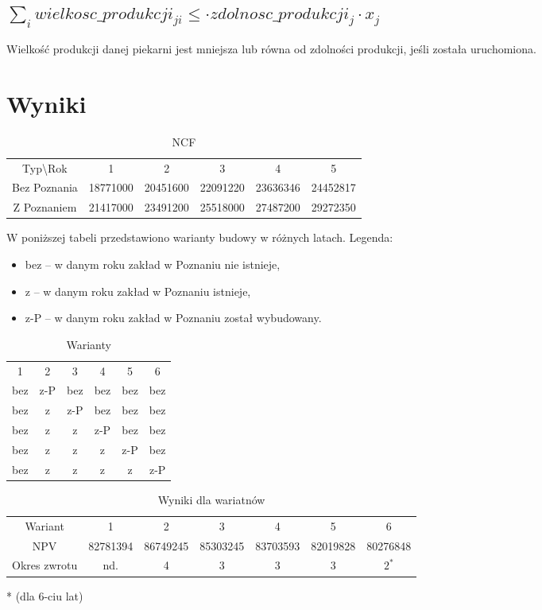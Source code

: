 \documentclass[a4paper]{article}
\begin{document}
\subsection{\(\sum_{i} wielkosc\_produkcji_{ji} \leq \cdot zdolnosc\_produkcji_j \cdot x_j\)}
Wielkość produkcji danej piekarni jest mniejsza lub równa od zdolności produkcji, jeśli została uruchomiona.
\section{Wyniki}
\begin{table}[H]
\centering
\begin{tabular}{cccccc}
Typ\textbackslash Rok & 1 & 2 & 3 & 4 & 5\\
Bez Poznania & 18771000 & 20451600 & 22091220 & 23636346 & 24452817\\
Z Poznaniem & 21417000 & 23491200 & 25518000 & 27487200 & 29272350\\
\end{tabular}
\caption{NCF}
\label{tab:ncf}
\end{table}
W poniższej tabeli przedstawiono warianty budowy w różnych latach.
Legenda:
\begin{itemize}
\item bez -- w danym roku zakład w Poznaniu nie istnieje,
\item z -- w danym roku zakład w Poznaniu istnieje,
\item z-P -- w danym roku zakład w Poznaniu został wybudowany.
\end{itemize}
\begin{table}[H]
\centering
\begin{tabular}{cccccc}
1 & 2 & 3 & 4 & 5 & 6\\
bez & z-P & bez & bez & bez & bez\\
bez & z   & z-P & bez & bez & bez\\
bez & z   & z   & z-P & bez & bez\\
bez & z   & z   & z   & z-P & bez\\
bez & z   & z   & z   & z   & z-P\\
\end{tabular}
\caption{Warianty}
\label{tab:warianty}
\end{table}
\begin{table}[H]
\centering
\begin{tabular}{ccccccc}
Wariant	& 1 & 2 & 3 & 4 & 5 & 6\\
NPV & 82781394 & 86749245 &	85303245 & 83703593 & 82019828 & 80276848\\
Okres zwrotu & nd. &	4 & 3 & 3 & 3 & $2^*$\\
\end{tabular}
\caption{Wyniki dla wariatnów}
\label{tab:wyniki}
\end{table}
* (dla 6-ciu lat)
\end{document}
